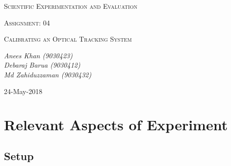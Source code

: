 \documentclass[10pt,a4paper]{article}
\begin{document}
	\begin{titlepage}
	\centering
	
		{\scshape\LARGE Scientific Experimentation and Evaluation\par}
		\vfill
		{\scshape\Large Assignment: 04\par}
		{\scshape\Large Calibrating an Optical Tracking System\par}
		\vfill
	
		\vfill
		{\Large\itshape Anees Khan (9030423)
			\\Debaraj Barua (9030412)\\
			Md Zahiduzzaman (9030432)
			\par}
		\vfill
	
		{\large 24-May-2018\par}
	\end{titlepage}
	\tableofcontents
	\newpage
	\section{Relevant Aspects of Experiment}
		\subsection{Setup}
\end{document}
